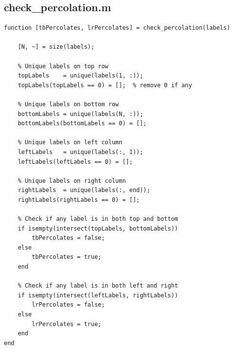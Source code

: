 \subsection*{check\_percolation.m}
\begin{lstlisting}[style=matlabstyle]
function [tbPercolates, lrPercolates] = check_percolation(labels)

    [N, ~] = size(labels);

    % Unique labels on top row
    topLabels    = unique(labels(1, :));
    topLabels(topLabels == 0) = [];  % remove 0 if any

    % Unique labels on bottom row
    bottomLabels = unique(labels(N, :));
    bottomLabels(bottomLabels == 0) = [];

    % Unique labels on left column
    leftLabels   = unique(labels(:, 1));
    leftLabels(leftLabels == 0) = [];

    % Unique labels on right column
    rightLabels  = unique(labels(:, end));
    rightLabels(rightLabels == 0) = [];

    % Check if any label is in both top and bottom
    if isempty(intersect(topLabels, bottomLabels))
        tbPercolates = false;
    else
        tbPercolates = true;
    end

    % Check if any label is in both left and right
    if isempty(intersect(leftLabels, rightLabels))
        lrPercolates = false;
    else
        lrPercolates = true;
    end
end
\end{lstlisting}
